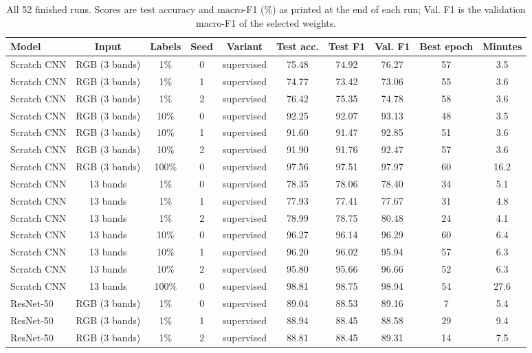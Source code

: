 \begin{table}[t]
\centering
\caption{All 52 finished runs. Scores are test accuracy and macro-F1 (\%) as printed at the end of each run; Val. F1 is the validation macro-F1 of the selected weights.}
\label{tab:all_runs}
\scriptsize
\begin{tabular}{lccccccccc}
\toprule
Model & Input & Labels & Seed & Variant & Test acc. & Test F1 & Val. F1 & Best epoch & Minutes \\
\midrule
Scratch CNN & RGB (3 bands) & 1\% & 0 & supervised & 75.48 & 74.92 & 76.27 & 57 & 3.5 \\
Scratch CNN & RGB (3 bands) & 1\% & 1 & supervised & 74.77 & 73.42 & 73.06 & 55 & 3.6 \\
Scratch CNN & RGB (3 bands) & 1\% & 2 & supervised & 76.42 & 75.35 & 74.78 & 58 & 3.6 \\
Scratch CNN & RGB (3 bands) & 10\% & 0 & supervised & 92.25 & 92.07 & 93.13 & 48 & 3.5 \\
Scratch CNN & RGB (3 bands) & 10\% & 1 & supervised & 91.60 & 91.47 & 92.85 & 51 & 3.6 \\
Scratch CNN & RGB (3 bands) & 10\% & 2 & supervised & 91.90 & 91.76 & 92.47 & 57 & 3.6 \\
Scratch CNN & RGB (3 bands) & 100\% & 0 & supervised & 97.56 & 97.51 & 97.97 & 60 & 16.2 \\
Scratch CNN & 13 bands & 1\% & 0 & supervised & 78.35 & 78.06 & 78.40 & 34 & 5.1 \\
Scratch CNN & 13 bands & 1\% & 1 & supervised & 77.93 & 77.41 & 77.67 & 31 & 4.8 \\
Scratch CNN & 13 bands & 1\% & 2 & supervised & 78.99 & 78.75 & 80.48 & 24 & 4.1 \\
Scratch CNN & 13 bands & 10\% & 0 & supervised & 96.27 & 96.14 & 96.29 & 60 & 6.4 \\
Scratch CNN & 13 bands & 10\% & 1 & supervised & 96.20 & 96.02 & 95.94 & 57 & 6.3 \\
Scratch CNN & 13 bands & 10\% & 2 & supervised & 95.80 & 95.66 & 96.66 & 52 & 6.3 \\
Scratch CNN & 13 bands & 100\% & 0 & supervised & 98.81 & 98.75 & 98.94 & 54 & 27.6 \\
ResNet-50 & RGB (3 bands) & 1\% & 0 & supervised & 89.04 & 88.53 & 89.16 & 7 & 5.4 \\
ResNet-50 & RGB (3 bands) & 1\% & 1 & supervised & 88.94 & 88.45 & 88.58 & 29 & 9.4 \\
ResNet-50 & RGB (3 bands) & 1\% & 2 & supervised & 88.81 & 88.45 & 89.31 & 14 & 7.5 \\

\end{tabular}
\end{table}
